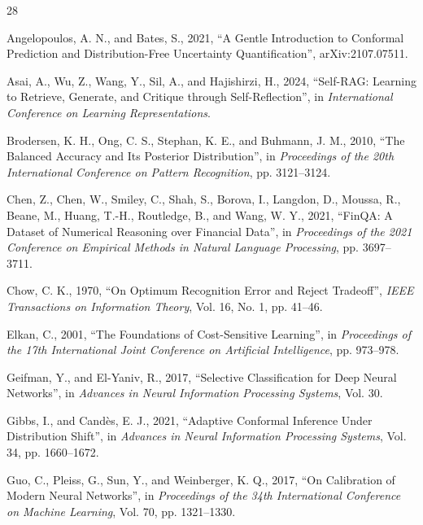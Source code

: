 \begin{thebibliography}{28}
\setlength{\bibsep}{0pt}
\setlength{\itemsep}{0pt}
\setlength{\parsep}{0pt}
\setlength{\bibhang}{2em}

Angelopoulos, A. N., and Bates, S., 2021, ``A Gentle Introduction to Conformal Prediction and Distribution-Free Uncertainty Quantification'', arXiv:2107.07511.

Asai, A., Wu, Z., Wang, Y., Sil, A., and Hajishirzi, H., 2024, ``Self-RAG: Learning to Retrieve, Generate, and Critique through Self-Reflection'', in \emph{International Conference on Learning Representations}.

Brodersen, K. H., Ong, C. S., Stephan, K. E., and Buhmann, J. M., 2010, ``The Balanced Accuracy and Its Posterior Distribution'', in \emph{Proceedings of the 20th International Conference on Pattern Recognition}, pp. 3121--3124.

Chen, Z., Chen, W., Smiley, C., Shah, S., Borova, I., Langdon, D., Moussa, R., Beane, M., Huang, T.-H., Routledge, B., and Wang, W. Y., 2021, ``FinQA: A Dataset of Numerical Reasoning over Financial Data'', in \emph{Proceedings of the 2021 Conference on Empirical Methods in Natural Language Processing}, pp. 3697--3711.

Chow, C. K., 1970, ``On Optimum Recognition Error and Reject Tradeoff'', \emph{IEEE Transactions on Information Theory}, Vol. 16, No. 1, pp. 41--46.

Elkan, C., 2001, ``The Foundations of Cost-Sensitive Learning'', in \emph{Proceedings of the 17th International Joint Conference on Artificial Intelligence}, pp. 973--978.

Geifman, Y., and El-Yaniv, R., 2017, ``Selective Classification for Deep Neural Networks'', in \emph{Advances in Neural Information Processing Systems}, Vol. 30.

Gibbs, I., and Cand\`es, E. J., 2021, ``Adaptive Conformal Inference Under Distribution Shift'', in \emph{Advances in Neural Information Processing Systems}, Vol. 34, pp. 1660--1672.

Guo, C., Pleiss, G., Sun, Y., and Weinberger, K. Q., 2017, ``On Calibration of Modern Neural Networks'', in \emph{Proceedings of the 34th International Conference on Machine Learning}, Vol. 70, pp. 1321--1330.


\end{thebibliography}
